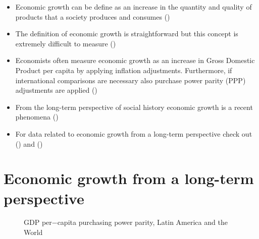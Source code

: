 \documentclass[
  ignorenonframetext,
]{beamer}
\begin{document}
\begin{frame}{}
\label{section-2}
\begin{itemize}
\item
  Economic growth can be define as an increase in the quantity and
  quality of products that a society produces and consumes
  ()
\item
  The definition of economic growth is straightforward but this concept
  is extremely difficult to measure
  ()
\item
  Economists often measure economic growth as an increase in Gross
  Domestic Product per capita by applying inflation adjustments.
  Furthermore, if international comparisons are necessary also purchase
  power parity (PPP) adjustments are applied
  ()
\item
  From the long-term perspective of social history economic growth is a
  recent phenomena ()
\item
  For data related to economic growth from a long-term perspective check
  out () and ()
\end{itemize}
\end{frame}

\section{Economic growth from a long-term
perspective}\label{economic-growth-from-a-long-term-perspective}

\begin{frame}{}
\label{section-3}
\begin{figure}


\caption{\label{fig-gdp-pc-ppp-latin-america-world}GDP per−capita
purchasing power parity, Latin America and the World}

\end{figure}%
\end{frame}
\end{document}
